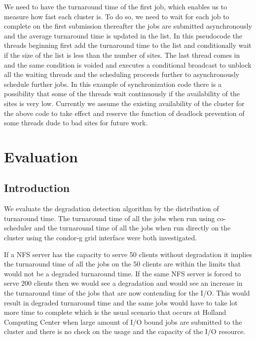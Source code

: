 \documentclass[ms,electronic,double]{nuthesis}
\begin{document}
We need to have the turnaround time of the first job,  which enables us to measure 
how fast each cluster is. To do so, we need to wait for each job to complete on 
the first submission thereafter the jobs are submitted asynchronously and the 
average turnaround time is updated in the list. In this pseudocode the threads 
beginning first add the turnaround time to the list and conditionally wait if 
the size of the list is less than the number of sites. The last thread comes in 
and the same condition is voided and executes a conditional broadcast to unblock 
all the waiting threads and the scheduling proceeds further to asynchronously schedule further 
jobs.
In this example of synchronization code there is a possibility that some of the 
threads wait continuously if the availability of the sites is very low. 
Currently we assume the existing availability of the cluster for the above code 
to take effect and reserve the function of deadlock prevention of some threads 
dude to bad sites for future work.

\chapter{Evaluation}

\section{Introduction}
We evaluate the degradation detection algorithm by the distribution of turnaround time. The turnaround 
time of all the jobs when run using co-scheduler and the turnaround time of all 
the jobs when run directly on the cluster using the condor-g grid interface were both investigated.

If a NFS server has the capacity to serve 50 clients without degradation it
implies the turnaround time of all the jobs on the 50 clients are within the 
limits that would not be a degraded turnaround time. If the same NFS server is forced to serve 200 
clients then we would see a degradation and would see an increase in the turnaround time of the jobs
that are now contending for the I/O. This would result in degraded turnaround time and 
the same jobs would have to take lot more time to complete which is the usual 
scenario that occurs at Holland Computing Center when large amount of I/O bound 
jobs are submitted to the cluster and there is no check on the usage and the 
capacity of the I/O resource.

\newpage
\end{document}
